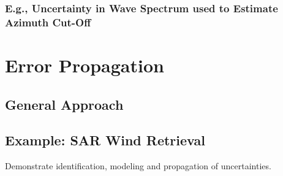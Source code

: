 \documentclass[pdftex,12pt,a4paper,oneside]{article}
\numberwithin{equation}{section} %
\begin{document}
\subsubsection{E.g., Uncertainty in Wave Spectrum used to Estimate Azimuth Cut-Off}

\section{Error Propagation}

\subsection{General Approach}
\subsection{Example: SAR Wind Retrieval}

Demonstrate identification, modeling and propagation of uncertainties.

%
%
%
%
%




\end{document}

